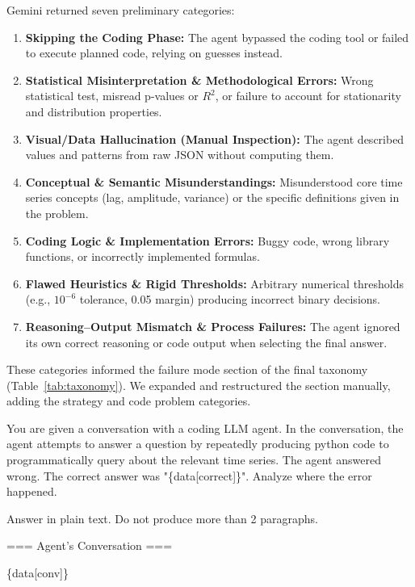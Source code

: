 \documentclass[11pt]{article}
\begin{document}
Gemini returned seven preliminary categories:

\begin{enumerate}
  \item \textbf{Skipping the Coding Phase:} The agent bypassed the coding tool or failed to execute planned code, relying on guesses instead.
  \item \textbf{Statistical Misinterpretation \& Methodological Errors:} Wrong statistical test, misread p-values or $R^2$, or failure to account for stationarity and distribution properties.
  \item \textbf{Visual/Data Hallucination (Manual Inspection):} The agent described values and patterns from raw JSON without computing them.
  \item \textbf{Conceptual \& Semantic Misunderstandings:} Misunderstood core time series concepts (lag, amplitude, variance) or the specific definitions given in the problem.
  \item \textbf{Coding Logic \& Implementation Errors:} Buggy code, wrong library functions, or incorrectly implemented formulas.
  \item \textbf{Flawed Heuristics \& Rigid Thresholds:} Arbitrary numerical thresholds (e.g., $10^{-6}$ tolerance, 0.05 margin) producing incorrect binary decisions.
  \item \textbf{Reasoning--Output Mismatch \& Process Failures:} The agent ignored its own correct reasoning or code output when selecting the final answer.
\end{enumerate}

These categories informed the failure mode section of the final taxonomy (Table~\ref{tab:taxonomy}). We expanded and restructured the section manually, adding the strategy and code problem categories.

\begingroup
\footnotesize
\centering
\begin{prompttextbox}
\begingroup
\ttfamily
\small
\sloppy
\obeyspaces
You are given a conversation with a coding LLM agent. In the conversation, the agent attempts to answer a question by repeatedly producing python code to programmatically query about the relevant time series. The agent answered wrong. The correct answer was "\{data[correct]\}". Analyze where the error happened.\par
\par
Answer in plain text. Do not produce more than 2 paragraphs.\par
\par
=== Agent's Conversation ===\par
\par
\{data[conv]\}\par
\endgroup
\end{prompttextbox}\par
\captionsetup{hypcap=false}
\label{fig:prompt_error_analysis}
\endgroup
\end{document}
